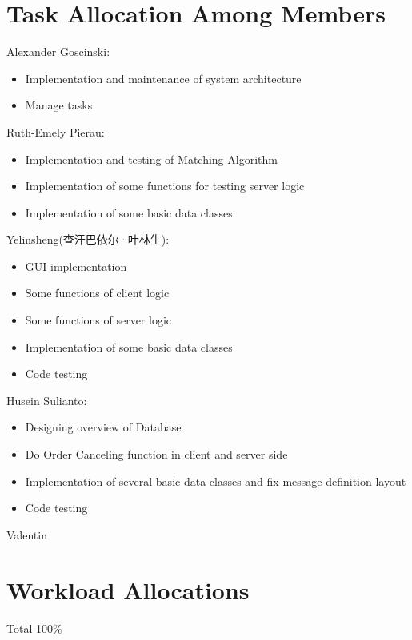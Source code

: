 \documentclass[a4paper, 11pt]{article}
\begin{document}
\section*{Task Allocation Among Members}

Alexander Goscinski:
\begin{itemize}
  \item Implementation and maintenance of system architecture
  \item Manage tasks
\end{itemize}
Ruth-Emely Pierau:
\begin{itemize}
	\item Implementation and testing of Matching Algorithm
	\item Implementation of some functions for testing server logic
	\item Implementation of some basic data classes
\end{itemize}
Yelinsheng(查汗巴依尔·叶林生):
\begin{itemize}
  \item GUI implementation
  \item Some functions of client logic
  \item Some functions of server logic
  \item Implementation of some basic data classes
  \item Code testing
\end{itemize}
Husein Sulianto:
\begin{itemize}
  \item Designing overview of Database
  \item Do Order Canceling function in client and server side
  \item Implementation of several basic data classes and fix message definition layout
  \item Code testing
\end{itemize}
Valentin


\section*{Workload Allocations}
Total 100\% \\
\end{document}
